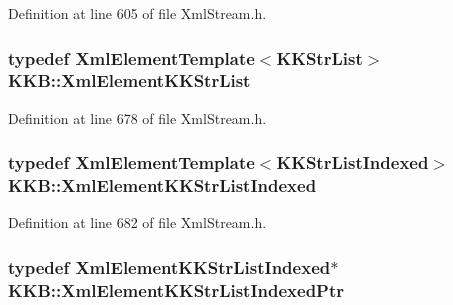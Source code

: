 Definition at line 605 of file Xml\+Stream.\+h.

\subsubsection[{\texorpdfstring{Xml\+Element\+K\+K\+Str\+List}{XmlElementKKStrList}}]{\setlength{\rightskip}{0pt plus 5cm}typedef {\bf Xml\+Element\+Template}$<${\bf K\+K\+Str\+List}$>$ {\bf K\+K\+B\+::\+Xml\+Element\+K\+K\+Str\+List}}\hypertarget{namespace_k_k_b_a200e36b6739def59860c742eb8168484}{}\label{namespace_k_k_b_a200e36b6739def59860c742eb8168484}


Definition at line 678 of file Xml\+Stream.\+h.

\subsubsection[{\texorpdfstring{Xml\+Element\+K\+K\+Str\+List\+Indexed}{XmlElementKKStrListIndexed}}]{\setlength{\rightskip}{0pt plus 5cm}typedef {\bf Xml\+Element\+Template}$<${\bf K\+K\+Str\+List\+Indexed}$>$ {\bf K\+K\+B\+::\+Xml\+Element\+K\+K\+Str\+List\+Indexed}}\hypertarget{namespace_k_k_b_ae29919a9a9a3ffa88c3b4757aba6b15e}{}\label{namespace_k_k_b_ae29919a9a9a3ffa88c3b4757aba6b15e}


Definition at line 682 of file Xml\+Stream.\+h.

\subsubsection[{\texorpdfstring{Xml\+Element\+K\+K\+Str\+List\+Indexed\+Ptr}{XmlElementKKStrListIndexedPtr}}]{\setlength{\rightskip}{0pt plus 5cm}typedef {\bf Xml\+Element\+K\+K\+Str\+List\+Indexed}$\ast$ {\bf K\+K\+B\+::\+Xml\+Element\+K\+K\+Str\+List\+Indexed\+Ptr}}\hypertarget{namespace_k_k_b_ae7d01c7c01d751e247ed5fdd17cd32ee}{}\label{namespace_k_k_b_ae7d01c7c01d751e247ed5fdd17cd32ee}


